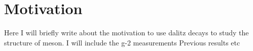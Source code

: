\section{Motivation}
Here I will briefly write about the motivation to use dalitz decays to study the structure of meson.
I will include the g-2 measurements
Previous results
etc
